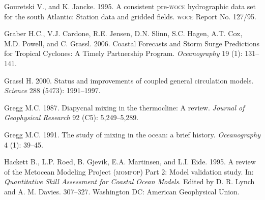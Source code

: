 \begin{thebibliography}{999}
Gouretski V., and K. Jancke.  1995. A consistent pre-\textsc{woce}
hydrographic data set for the south Atlantic: Station data and gridded
fields.  \textsc{woce} Report No. 127/95.
%

Graber H.C., V.J. Cardone, R.E. Jensen, D.N. Slinn, S.C. Hagen,
A.T. Cox, M.D. Powell, and C. Grassl. 2006. Coastal Forecasts and
Storm Surge Predictions for Tropical Cyclones: A Timely Partnership
Program. \textit{Oceanography} 19 (1): 131--141.
%

Grassl H.  2000. Status and improvements of coupled general
circulation models. \textit{Science} 288 (5473): 1991--1997.
%

Gregg M.C.  1987. Diapycnal mixing in the thermocline: A review.
\textit{Journal of Geophysical Research} 92 (C5): 5,249--5,289.
%

Gregg M.C.  1991. The study of mixing in the ocean: a brief history.
\textit{Oceanography} 4 (1): 39--45.
%

Hackett B., L.P. Roed, B. Gjevik, E.A. Martinsen, and
L.I. Eide. 1995. A review of the Metocean Modeling Project
(\textsc{mompop}) Part 2: Model validation study. In:
\textit{Quantitative Skill Assessment for Coastal Ocean
  Models}. Edited by D. R. Lynch and
A. M. Davies. 307--327. Washington DC: American Geophysical Union.
%


\end{thebibliography}
